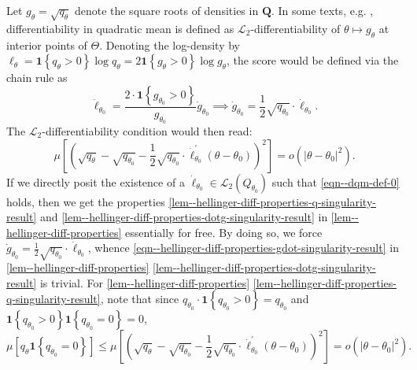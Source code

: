 \documentclass[12pt]{article}
\let\Cref\autoref
\def\L{\mathscr{L}}
\def\ind{\mathbf{1}}
\theoremstyle{definition}
\theoremstyle{plain}
\begin{document}
Let \(g_{\theta} = \sqrt{q_{\theta}}\) denote the square roots of densities in
\(\mathbf{Q}\).
In some texts, e.g. \citet{1998bickelEfficientAdaptiveEstimation},
differentiability in quadratic mean is defined as \(\L_{2}\)-differentiability
of \(\theta \mapsto g_{\theta}\) at interior points of \(\Theta\).
Denoting the log-density by \(\ell_{\theta} = \mathbf{1} \left\{
q_{\theta} > 0 \right\} \log q_{\theta} = 2 \mathbf{1} \left\{ g_{\theta} > 0
\right\} \log g_{\theta}\), the score would be defined via the chain rule as
\begin{equation}
  \dot{\ell}_{\theta_{0}} = \frac{2 \cdot \mathbf{1} \left\{ g_{\theta_{0}} > 0
  \right\}}{g_{\theta_{0}}} \dot{g}_{\theta_{0}} \implies \dot{g}_{\theta_{0}}
  = \frac{1}{2} \sqrt{q_{\theta_{0}}} \cdot \dot{\ell}_{\theta_{0}}.
  \label{eqn--score-root-density-deriv}
\end{equation}
The \(\L_{2}\)-differentiability condition would then read:
\begin{equation}
  \mu \left[ \left( \sqrt{q_{\theta}} - \sqrt{q_{\theta_{0}}} - \frac{1}{2}
  \sqrt{q_{\theta_{0}}} \cdot \dot{\ell}_{\theta_{0}}^{\prime} \left( \theta -
  \theta_{0} \right) \right)^{2} \right] = o \left( \left| \theta -
  \theta_{0} \right|^{2} \right).
  \label{eqn--dqm-def-0}
\end{equation}
If we directly posit the existence of a \(\dot{\ell}_{\theta_{0}} \in \L_{2}
\left( Q_{\theta_{0}} \right)\) such that \eqref{eqn--dqm-def-0} holds,
then we get the properties
\ref{lem--hellinger-diff-properties-q-singularity-result} and
\ref{lem--hellinger-diff-properties-dotg-singularity-result} in
\Cref{lem--hellinger-diff-properties} essentially for free.
By doing so, we force
\(\dot{g}_{\theta_{0}} = \frac{1}{2} \sqrt{q_{\theta_{0}}} \cdot
\dot{\ell}_{\theta_{0}}\), whence
\eqref{eqn--hellinger-diff-properties-gdot-singularity-result} in
\Cref{lem--hellinger-diff-properties}
\ref{lem--hellinger-diff-properties-dotg-singularity-result} is trivial.
For \Cref{lem--hellinger-diff-properties}
\ref{lem--hellinger-diff-properties-q-singularity-result}, note that since
\(q_{\theta_{0}} \cdot \ind \left\{ q_{\theta_{0}} > 0 \right\} =
q_{\theta_{0}}\) and \(\ind \left\{ q_{\theta_{0}}
> 0 \right\} \ind \left\{ q_{\theta_{0}} = 0 \right\} = 0\),
\begin{equation*}
  \mu \left[ q_{\theta} \ind \left\{ q_{\theta_{0}} = 0 \right\} \right] \leq
  \mu \left[ \left( \sqrt{q_{\theta}} - \sqrt{q_{\theta_{0}}} - \frac{1}{2}
  \sqrt{q_{\theta_{0}}} \cdot \dot{\ell}_{\theta_{0}}^{\prime} \left( \theta -
  \theta_{0} \right) \right)^{2} \right] = o \left( \left| \theta -
  \theta_{0} \right|^{2} \right).
\end{equation*}
\end{document}
